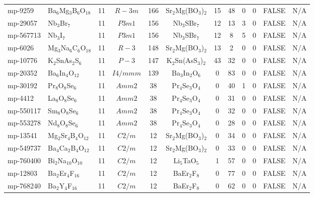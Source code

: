 {\begin{longtable}{llcccccccccc}
    mp-9259 & Ba$_{6}$Mg$_{3}$B$_{6}$O$_{18}$ & 11    & $R-3m$ & 166   & Sr$_{2}$Mg(BO$_{3}$)$_{2}$ & 15    & 48    & 0     & 0     & FALSE & N/A \\
    mp-29057 & Nb$_{3}$Br$_{7}$ & 11    & $P3m1$ & 156   & Nb$_{3}$SBr$_{7}$ & 12    & 13    & 3     & 0     & FALSE & N/A \\
    mp-567713 & Nb$_{3}$I$_{7}$ & 11    & $P3m1$ & 156   & Nb$_{3}$SBr$_{7}$ & 12    & 8     & 5     & 0     & FALSE & N/A \\
    mp-6026 & Mg$_{3}$Na$_{6}$C$_{6}$O$_{18}$ & 11    & $R-3$ & 148   & Sr$_{2}$Mg(BO$_{3}$)$_{2}$ & 13    & 2     & 0     & 0     & FALSE & N/A \\
    mp-10776 & K$_{2}$SnAs$_{2}$S$_{6}$ & 11    & $P-3$ & 147   & K$_{2}$Sn(AsS$_{3}$)$_{2}$ & 43    & 32    & 0     & 0     & FALSE & N/A \\
    mp-20352 & Ba$_{6}$In$_{4}$O$_{12}$ & 11    & $I4/mmm$ & 139   & Ba$_{3}$In$_{2}$O$_{6}$ & 0     & 83    & 0     & 0     & FALSE & N/A \\
    mp-30192 & Pr$_{8}$O$_{8}$Se$_{6}$ & 11    & $Amm2$ & 38    & Pr$_{4}$Se$_{3}$O$_{4}$ & 0     & 40    & 1     & 0     & FALSE & N/A \\
    mp-4412 & La$_{8}$O$_{8}$Se$_{6}$ & 11    & $Amm2$ & 38    & Pr$_{4}$Se$_{3}$O$_{4}$ & 0     & 31    & 0     & 0     & FALSE & N/A \\
    mp-550117 & Sm$_{8}$O$_{8}$Se$_{6}$ & 11    & $Amm2$ & 38    & Pr$_{4}$Se$_{3}$O$_{4}$ & 0     & 32    & 0     & 0     & FALSE & N/A \\
    mp-553278 & Nd$_{8}$O$_{8}$Se$_{6}$ & 11    & $Amm2$ & 38    & Pr$_{4}$Se$_{3}$O$_{4}$ & 0     & 28    & 0     & 0     & FALSE & N/A \\
    mp-13541 & Mg$_{2}$Sr$_{4}$B$_{4}$O$_{12}$ & 11    & $C2/m$ & 12    & Sr$_{2}$Mg(BO$_{3}$)$_{2}$ & 0     & 34    & 0     & 0     & FALSE & N/A \\
    mp-549737 & Ba$_{4}$Ca$_{2}$B$_{4}$O$_{12}$ & 11    & $C2/m$ & 12    & Sr$_{2}$Mg(BO$_{3}$)$_{2}$ & 0     & 33    & 0     & 0     & FALSE & N/A \\
    mp-760400 & Bi$_{2}$Na$_{10}$O$_{10}$ & 11    & $C2/m$ & 12    & Li$_{5}$TaO$_{5}$ & 1     & 57    & 0     & 0     & FALSE & N/A \\
    mp-12803 & Ba$_{2}$Er$_{4}$F$_{16}$ & 11    & $C2/m$ & 12    & BaEr$_{2}$F$_{8}$ & 0     & 77    & 0     & 0     & FALSE & N/A \\
    mp-768240 & Ba$_{2}$Y$_{4}$F$_{16}$ & 11    & $C2/m$ & 12    & BaEr$_{2}$F$_{8}$ & 0     & 62    & 0     & 0     & FALSE & N/A \\

\end{longtable}}
